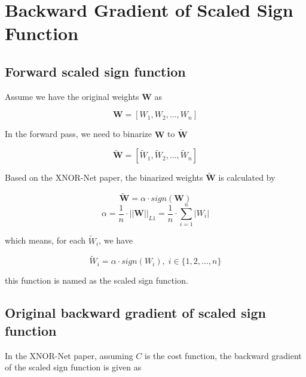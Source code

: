 \documentclass[12pt]{article} %
\begin{document}

\section{Backward Gradient of Scaled Sign Function} %
\subsection{Forward scaled sign function}
Assume we have the original weights $\mathbf{W}$ as

\begin{equation}
	\mathbf{W}=[W_{1},W_{2}, ..., W_{n}]
\end{equation}

In the forward pass, we need to binarize $\mathbf{W}$ to $\mathbf{\widetilde{W}}$

\begin{equation}
	\mathbf{\widetilde{W}}=[\widetilde{W}_{1},\widetilde{W}_{2}, ..., \widetilde{W}_{n}]
\end{equation}

Based on the XNOR-Net paper, the binarized weights $\mathbf{\widetilde{W}}$ is calculated by

\begin{equation}
	\mathbf{\widetilde{W}}=\alpha \cdot sign(\mathbf{W})
\end{equation}
\begin{equation}
	\alpha = \frac{1}{n} \cdot {||\mathbf{W}||}_{L1} = \frac{1}{n} \cdot
	\sum_{i=1}^{n} |W_{i}|
\end{equation}

which means, for each $\widetilde{W}_{i}$, we have

\begin{equation}
	\widetilde{W}_{i} =\alpha \cdot sign(W_{i}), \; i \in \{1,2,...,n\}
\end{equation}

this function is named as the scaled sign function.


\subsection{Original backward gradient of scaled sign function}
In the XNOR-Net paper, assuming $C$ is the cost function, the backward gradient of the scaled sign function is given as
\end{document}
